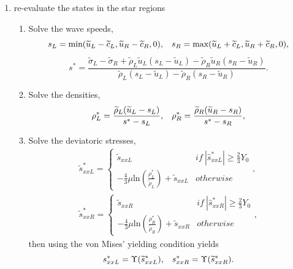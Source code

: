\documentclass{article}
\numberwithin{equation}{section}
\numberwithin{table}{section}
\begin{document}
\begin{enumerate}
\begin{enumerate}
        \end{enumerate}
  \item re-evaluate the states in the star regions
  \begin{enumerate}
    \item Solve the wave speeds,
\begin{equation*}
  s_L = \text{min} (\widetilde{u}_L-\widetilde{c}_L, \widetilde{u}_R-\widetilde{c}_R,0), \hspace{0.3cm} s_R = \text{max}(\widetilde{u}_L+\widetilde{c}_L, \widetilde{u}_R+\widetilde{c}_R,0),
	\end{equation*}
	\begin{equation*}
	  s^* = \frac{\widetilde{\sigma}_L-\widetilde{\sigma}_R+\widetilde{\rho}_L \widetilde{u}_L(s_L-\widetilde{u}_L)-\widetilde{\rho}_R \widetilde{u}_R(s_R-\widetilde{u}_R)}{\widetilde{\rho}_L(s_L-\widetilde{u}_L)-\widetilde{\rho}_R(s_R-\widetilde{u}_R)}.
\end{equation*}

    \item Solve the densities,
\begin{equation*}
  \rho_L^* = \frac{\widetilde{\rho}_L(\widetilde{u}_L-s_L)}{s^*-s_L}, \hspace{0.3cm}  \rho_R^* = \frac{\widetilde{\rho}_R(\widetilde{u}_R-s_R)}{s^*-s_R},
\end{equation*}

    \item Solve the deviatoric stresses,
 \begin{align*}
   \widetilde{s}_{xxL}^* = \left\{\begin{array}{cc}
                       \widetilde{s}_{xxL} & if \ |\hat{s}_{xxL}^{*}|\geq \frac{2}{3}Y_{0} \\
                        -\frac{4}{3}\mu \text{ln}\left( \frac{\rho_L^*}{\widetilde{\rho}_L}  \right)+\widetilde{s}_{xxL} & otherwise
                     \end{array}\right.
   ,\\
   \widetilde{s}_{xxR}^* =  \left\{\begin{array}{cc}
                       \widetilde{s}_{xxR} & if \ |\hat{s}_{xxR}^{*}| \geq \frac{2}{3}Y_{0} \\
                        -\frac{4}{3}\mu \text{ln}\left( \frac{\rho_R^*}{\widetilde{\rho}_R}  \right)+\widetilde{s}_{xxR} & otherwise
                     \end{array}\right.
    ,
\end{align*}
then using  the von Mises' yielding condition yields
\begin{equation*}
  s_{xxL}^* = \Upsilon(\widetilde{s}_{xxL}^*) , \hspace{0.3cm}  s_{xxR}^* = \Upsilon(\widetilde{s}_{xxR}^*).
\end{equation*}


\end{enumerate}
\end{enumerate}
\end{document}
